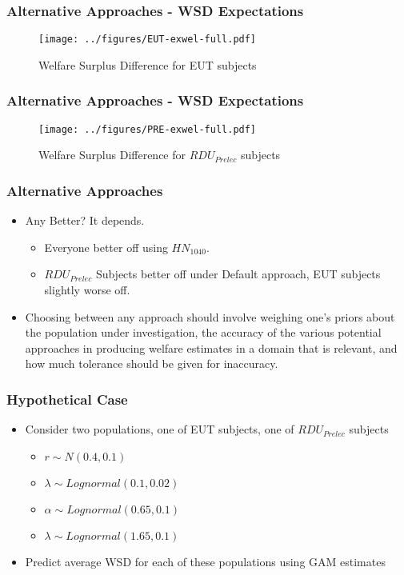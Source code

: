 \documentclass{beamer}
\begin{document}
\begin{frame}
\frametitle{Alternative Approaches - WSD Expectations}
	\begin{figure}[ht!]
		\center
		\caption{Welfare Surplus Difference for EUT subjects}
		\texttt{[image: ../figures/EUT-exwel-full.pdf]}
		\label{fig:exwel-eut}
	\end{figure}
\end{frame}

\begin{frame}
\frametitle{Alternative Approaches - WSD Expectations}
\begin{figure}[ht!]
	\center
	\caption{Welfare Surplus Difference for $\mathit{RDU_{Prelec}}$ subjects}
	\texttt{[image: ../figures/PRE-exwel-full.pdf]}
	\label{fig:exwel-pre}
\end{figure}
\end{frame}

\begin{frame}
\frametitle{Alternative Approaches}
\begin{itemize}
	\item Any Better? It depends.
		\begin{itemize}
			\item Everyone better off using ${HN}_{1040}$.
			\item $\mathit{RDU_{Prelec}}$ Subjects better off under Default approach, EUT subjects slightly worse off.
		\end{itemize}
	\item Choosing between any approach should involve weighing one's priors about the population under investigation, the accuracy of the various potential approaches in producing welfare estimates in a domain that is relevant, and how much tolerance should be given for inaccuracy.
\end{itemize}
\end{frame}

\begin{frame}
\frametitle{Hypothetical Case}
\begin{itemize}
	\item Consider two populations, one of EUT subjects, one of $\mathit{RDU_{Prelec}}$ subjects
		\begin{itemize}
			\item $r       \sim \mathit{N}(0.4, 0.1)$
			\item $\lambda \sim \mathit{Lognormal}(0.1, 0.02)$
			\item $\alpha  \sim \mathit{Lognormal}(0.65, 0.1)$
			\item $\lambda \sim \mathit{Lognormal}(1.65, 0.1)$
		\end{itemize}
	\item Predict average WSD for each of these populations using GAM estimates
\end{itemize}
\end{frame}
\end{document}
